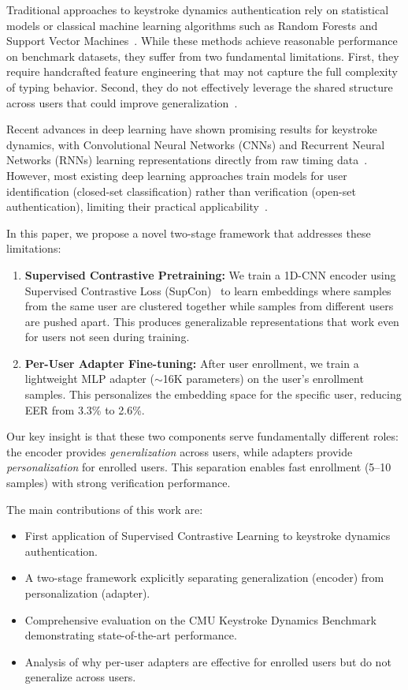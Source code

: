 \documentclass{ieeeaccess}
\begin{document}
{Traditional approaches to keystroke dynamics authentication rely on statistical models or classical machine learning algorithms such as Random Forests and Support Vector Machines~\cite{b4,b5}. While these methods achieve reasonable performance on benchmark datasets, they suffer from two fundamental limitations. First, they require handcrafted feature engineering that may not capture the full complexity of typing behavior. Second, they do not effectively leverage the shared structure across users that could improve generalization~\cite{b6}.

Recent advances in deep learning have shown promising results for keystroke dynamics, with Convolutional Neural Networks (CNNs) and Recurrent Neural Networks (RNNs) learning representations directly from raw timing data~\cite{b7,b8}. However, most existing deep learning approaches train models for user identification (closed-set classification) rather than verification (open-set authentication), limiting their practical applicability~\cite{b9}.

In this paper, we propose a novel two-stage framework that addresses these limitations:

\begin{enumerate}
\item \textbf{Supervised Contrastive Pretraining:} We train a 1D-CNN encoder using Supervised Contrastive Loss (SupCon)~\cite{b10} to learn embeddings where samples from the same user are clustered together while samples from different users are pushed apart. This produces generalizable representations that work even for users not seen during training.

\item \textbf{Per-User Adapter Fine-tuning:} After user enrollment, we train a lightweight MLP adapter ($\sim$16K parameters) on the user's enrollment samples. This personalizes the embedding space for the specific user, reducing EER from 3.3\% to 2.6\%.
\end{enumerate}

Our key insight is that these two components serve fundamentally different roles: the encoder provides \textit{generalization} across users, while adapters provide \textit{personalization} for enrolled users. This separation enables fast enrollment (5--10 samples) with strong verification performance.

The main contributions of this work are:
\begin{itemize}
\item First application of Supervised Contrastive Learning to keystroke dynamics authentication.
\item A two-stage framework explicitly separating generalization (encoder) from personalization (adapter).
\item Comprehensive evaluation on the CMU Keystroke Dynamics Benchmark demonstrating state-of-the-art performance.
\item Analysis of why per-user adapters are effective for enrolled users but do not generalize across users.
\end{itemize}

}
\end{document}
